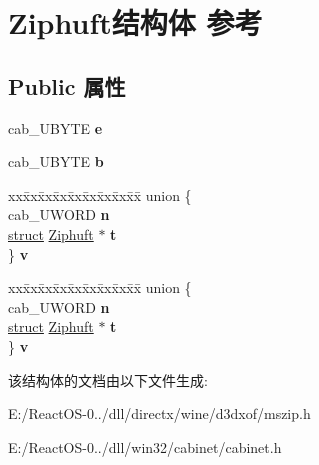 \hypertarget{struct_ziphuft}{}\section{Ziphuft结构体 参考}
\label{struct_ziphuft}
\subsection*{Public 属性}
\begin{DoxyCompactItemize}
\item 
\mbox{\label{struct_ziphuft_a83ad68ae647254ee29a878209ce4874f}} 
cab\+\_\+\+U\+B\+Y\+TE {\bfseries e}
\item 
\mbox{\label{struct_ziphuft_a3c848867c2391bda34cf532e981feea8}} 
cab\+\_\+\+U\+B\+Y\+TE {\bfseries b}
\item 
\mbox{\label{struct_ziphuft_a85316d4f0bbae7a7ec737af3ddad6eac}} 
\begin{tabbing}
xx\=xx\=xx\=xx\=xx\=xx\=xx\=xx\=xx\=\kill
union \{\\
\>cab\_UWORD {\bfseries n}\\
\>\hyperlink{interfacestruct}{struct} \hyperlink{struct_ziphuft}{Ziphuft} $\ast$ {\bfseries t}\\
\} {\bfseries v}\\

\end{tabbing}\item 
\mbox{\label{struct_ziphuft_adfe7b605b79e31311d4a1b3f9e3ddf43}} 
\begin{tabbing}
xx\=xx\=xx\=xx\=xx\=xx\=xx\=xx\=xx\=\kill
union \{\\
\>cab\_UWORD {\bfseries n}\\
\>\hyperlink{interfacestruct}{struct} \hyperlink{struct_ziphuft}{Ziphuft} $\ast$ {\bfseries t}\\
\} {\bfseries v}\\

\end{tabbing}\end{DoxyCompactItemize}


该结构体的文档由以下文件生成\+:\begin{DoxyCompactItemize}
\item 
E\+:/\+React\+O\+S-\/0../dll/directx/wine/d3dxof/mszip.\+h\item 
E\+:/\+React\+O\+S-\/0../dll/win32/cabinet/cabinet.\+h\end{DoxyCompactItemize}
